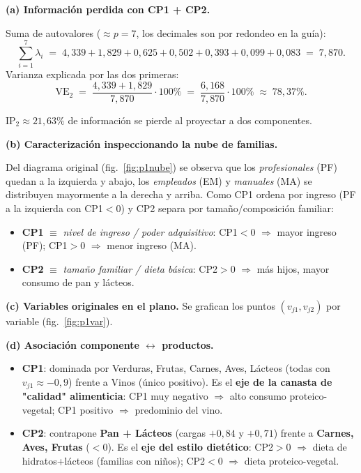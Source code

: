 \documentclass[11pt,a4paper]{article}
\begin{document}
\begin{solbox}
\textbf{(a) Información perdida con CP1 + CP2.}

Suma de autovalores ($\approx p = 7$, los decimales son por redondeo en la guía):
\[
\sum_{i=1}^{7}\lambda_i \;=\; 4{,}339+1{,}829+0{,}625+0{,}502+0{,}393+0{,}099+0{,}083 \;=\; 7{,}870.
\]
Varianza explicada por las dos primeras:
\[
\mathrm{VE}_2 \;=\; \frac{4{,}339+1{,}829}{7{,}870}\cdot 100\% \;=\; \frac{6{,}168}{7{,}870}\cdot 100\% \;\approx\; 78{,}37\%.
\]
\begin{respbox}
$\boxed{\mathrm{IP}_2 \approx 21{,}63\%}$ de información se pierde al proyectar a dos componentes.
\end{respbox}

\textbf{(b) Caracterización inspeccionando la nube de familias.}

Del diagrama original (fig.~\ref{fig:p1nube}) se observa que los \emph{profesionales} (PF) quedan a la izquierda y abajo, los \emph{empleados} (EM) y \emph{manuales} (MA) se distribuyen mayormente a la derecha y arriba. Como CP1 ordena por ingreso (PF a la izquierda con CP1$<0$) y CP2 separa por tamaño/composición familiar:

\begin{itemize}[noitemsep,leftmargin=*]
\item \textbf{CP1} $\equiv$ \emph{nivel de ingreso / poder adquisitivo}: CP1$<0$ $\Rightarrow$ mayor ingreso (PF); CP1$>0$ $\Rightarrow$ menor ingreso (MA).
\item \textbf{CP2} $\equiv$ \emph{tamaño familiar / dieta básica}: CP2$>0$ $\Rightarrow$ más hijos, mayor consumo de pan y lácteos.
\end{itemize}

\textbf{(c) Variables originales en el plano.} Se grafican los puntos $(v_{j1},v_{j2})$ por variable (fig.~\ref{fig:p1var}).

\textbf{(d) Asociación componente $\leftrightarrow$ productos.}
\begin{itemize}[noitemsep,leftmargin=*]
\item \textbf{CP1}: dominada por Verduras, Frutas, Carnes, Aves, Lácteos (todas con $v_{j1}\approx-0{,}9$) frente a Vinos (único positivo). Es el \textbf{eje de la canasta de "calidad" alimenticia}: CP1 muy negativo $\Rightarrow$ alto consumo proteico-vegetal; CP1 positivo $\Rightarrow$ predominio del vino.
\item \textbf{CP2}: contrapone \textbf{Pan + Lácteos} (cargas $+0{,}84$ y $+0{,}71$) frente a \textbf{Carnes, Aves, Frutas} ($<0$). Es el \textbf{eje del estilo dietético}: CP2$>0$ $\Rightarrow$ dieta de hidratos+lácteos (familias con niños); CP2$<0$ $\Rightarrow$ dieta proteico-vegetal.
\end{itemize}


\end{solbox}
\end{document}
